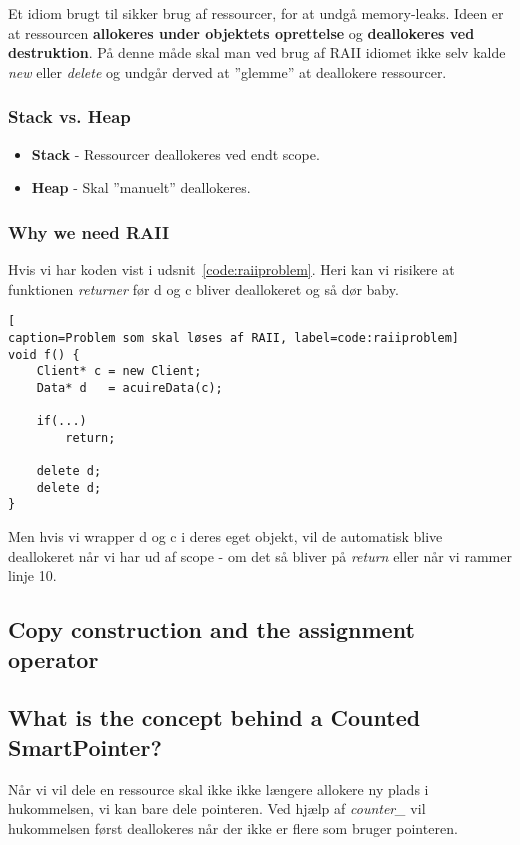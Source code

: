 Et idiom brugt til sikker brug af ressourcer, for at undgå memory-leaks. Ideen er at ressourcen \textbf{allokeres under objektets oprettelse} og \textbf{deallokeres ved destruktion}. På denne måde skal man ved brug af RAII idiomet ikke selv kalde \textit{new} eller \textit{delete} og undgår derved at ''glemme'' at deallokere ressourcer.

\subsubsection{Stack vs. Heap}
\begin{itemize}
	\item \textbf{Stack} - Ressourcer deallokeres ved endt scope.
	\item \textbf{Heap} - Skal ''manuelt'' deallokeres.
\end{itemize}

\subsubsection{Why we need RAII}
Hvis vi har koden vist i udsnit~\ref{code:raiiproblem}. Heri kan vi risikere at funktionen \textit{returner} før d og c bliver deallokeret og så dør baby.

\begin{minipage}{\linewidth}
\begin{lstlisting}[
caption=Problem som skal løses af RAII, label=code:raiiproblem]
void f() {
	Client* c = new Client;
	Data* d   = acuireData(c);
	
	if(...)
		return;
	
	delete d;
	delete d; 
}
\end{lstlisting}
\end{minipage}

Men hvis vi wrapper d og c i deres eget objekt, vil de automatisk blive deallokeret når vi har ud af scope - om det så bliver på \textit{return} eller når vi rammer linje 10.

\subsection{Copy construction and the assignment operator}

\subsection{What is the concept behind a Counted SmartPointer?}
Når vi vil dele en ressource skal ikke ikke længere allokere ny plads i hukommelsen, vi kan bare dele pointeren. Ved hjælp af \textit{counter\_} vil hukommelsen først deallokeres når der ikke er flere som bruger pointeren.\\

